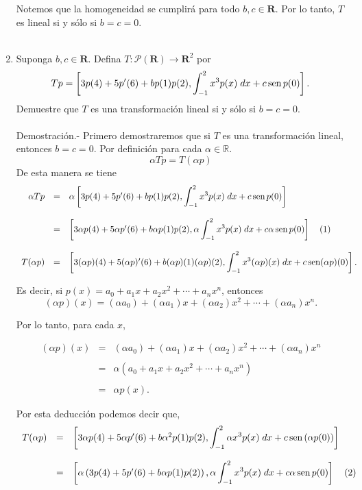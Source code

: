 \begin{enumerate}[\bfseries 1.]
	Notemos que la homogeneidad se cumplirá para todo $b,c\in \textbf{R}$. Por lo tanto, $T$ es lineal si y sólo si $b=c=0$.\\\\

    \item Suponga $b,c\in \textbf{R}$. Defina $T:\mathcal{P}(\textbf{R})\to \textbf{R}^2$  por
    $$Tp=\left[3p(4)+5p'(6)+bp(1)p(2),\int_{-1}^2 x^3p(x)\; dx +c\mathop{\mbox{\normalfont sen}}\nolimits p(0)\right].$$
    Demuestre que $T$ es una transformación lineal si y sólo si $b=c=0$.\\\\
	Demostración.-\; Primero demostraremos que si $T$ es una transformación lineal, entonces $b=c=0$. Por definición para cada $\alpha\in \mathbb{R}$.
	$$\alpha Tp = T(\alpha p)$$
	De esta manera se tiene
	$$
	\begin{array}{rcl}
	    \alpha T p &=& \alpha \left[3p(4)+5p'(6)+bp(1)p(2),\displaystyle\int_{-1}^2 x^3p(x)\; dx +c\mathop{\mbox{\normalfont sen}}\nolimits p(0)\right] \\\\
		       &=& \left[3\alpha p(4)+5\alpha p'(6)+b\alpha p(1)p(2),\alpha \displaystyle\int_{-1}^2 x^3 p(x) \; dx+c\alpha\mathop{\mbox{\normalfont sen}}\nolimits p(0)\right]\quad (1)\\\\
		       T(\alpha p)&=& \left[3(\alpha p)(4) + 5(\alpha p)'(6) + b(\alpha p)(1)(\alpha p)(2),\displaystyle\int_{-1}^2 x^3(\alpha p)(x)\; dx + c\mathop{\mbox{\normalfont sen}}\nolimits (\alpha p)(0)\right].
	\end{array}
	$$

	Es decir, si $p(x)=a_0+a_1x+a_2x^2+\cdots + a_nx^n$, entonces 
	$$(\alpha p)(x)=\left(\alpha a_0\right)+\left(\alpha a_1\right)x+\left(\alpha a_2\right)x^2+\cdots + \left(\alpha a_n\right)x^n.$$

	Por lo tanto, para cada $x$,

	$$
	\begin{array}{rcl}
	    (\alpha p)(x) &=& \left(\alpha a_0\right)+\left(\alpha a_1\right)x+\left(\alpha a_2\right)x^2+\cdots + \left(\alpha a_n\right)x^n\\\\
	    &=& \alpha\left(a_0+a_1x+a_2x^2+\cdots + a_nx^n\right)\\\\
	    &=& \alpha p(x).
	\end{array}
	$$

	Por esta deducción podemos decir que,
	$$
	\begin{array}{rcl}
	    T(\alpha p) &=& \left[3\alpha p(4)+5\alpha p'(6)+b\alpha^2p(1)p(2),\displaystyle\int_{-1}^2 \alpha x^3 p(x)\; dx + c\mathop{\mbox{\normalfont sen}}\nolimits\left(\alpha p(0)\right)\right]\\\\
			&=& \left[\alpha\left(3p(4)+5p'(6)+b\alpha p(1)p(2)\right),\alpha\displaystyle\int_{-1}^2 x^3 p(x)\; dx + c\alpha \mathop{\mbox{\normalfont sen}}\nolimits p(0)\right]\quad (2)\\\\
	\end{array}
	$$


\end{enumerate}
